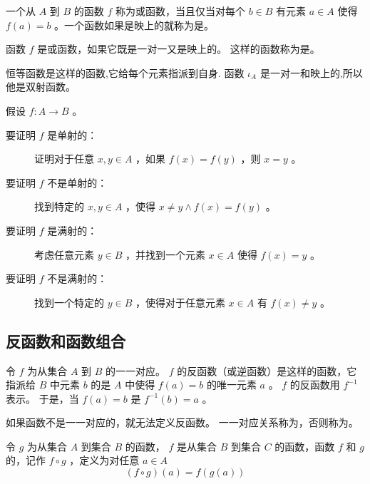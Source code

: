 {{        \begin{defines}
            一个从 $A$ 到 $B$ 的函数 $f$ 称为或函数，当且仅当对每个 $b \in B$ 有元素 $a \in A$ 使得 $f(a) = b$ 。一个函数如果是映上的就称为是。
        \end{defines}

        \begin{defines}
            函数 $f$ 是或函数，如果它既是一对一又是映上的。
            这样的函数称为是。
        \end{defines}

        恒等函数是这样的函数,它给每个元素指派到自身.
        函数 $\iota_A$ 是一对一和映上的,所以他是双射函数。

        假设 $f : A \rightarrow B$ 。

        \begin{description}
            \item[要证明 $f$ 是单射的：] 证明对于任意 $x, y \in A$ ，如果 $f(x) = f(y)$ ，则 $x = y$ 。
            \item[要证明 $f$ 不是单射的：] 找到特定的 $x, y \in A$ ，使得 $x \neq y \wedge f(x) = f(y)$ 。
            \item[要证明 $f$ 是满射的：] 考虑任意元素 $y \in B$ ，并找到一个元素 $x \in A$ 使得 $f(x) = y$ 。
            \item[要证明 $f$ 不是满射的：] 找到一个特定的 $y \in B$ ，使得对于任意元素 $x \in A$ 有 $f(x) \neq y$ 。   
        \end{description}
    }

    \subsection{反函数和函数组合}
    {
        \begin{defines}
            令 $f$ 为从集合 $A$ 到 $B$ 的一一对应。
            $f$ 的反函数（或逆函数）是这样的函数，它指派给 $B$ 中元素 $b$ 的是 $A$ 中使得 $f(a) = b$ 的唯一元素 $a$ 。
            $f$ 的反函数用 $f^{-1}$ 表示。
            于是，当 $f(a) = b$ 是 $f^{-1}(b) = a$ 。
        \end{defines}

        如果函数不是一一对应的，就无法定义反函数。
        一一对应关系称为，否则称为。

        \begin{defines}
            令 $g$ 为从集合 $A$ 到集合 $B$ 的函数， $f$ 是从集合 $B$ 到集合 $C$ 的函数，函数 $f$ 和 $g$ 的，记作 $f \circ g$ ，定义为对任意 $a \in A$
            $$(f \circ g)(a) = f(g(a))$$
        \end{defines}

}}
